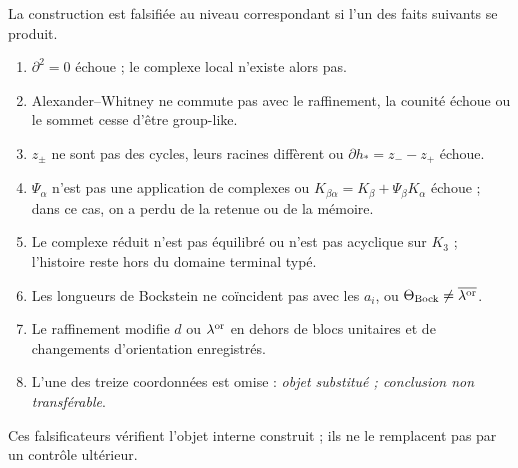 \begin{ablation}
\label{abl:detint-falsadores}
La construction est falsifiée au niveau correspondant si l'un des
faits suivants se produit.
\begin{enumerate}
 \item \(\partial^2=0\) échoue ; le complexe local n'existe alors pas.
 \item Alexander--Whitney ne commute pas avec le raffinement, la counité échoue ou
 le sommet cesse d'être group-like.
 \item \(z_\pm\) ne sont pas des cycles, leurs racines diffèrent ou
 \(\partial h_*=z_--z_+\) échoue.
 \item \(\Psi_\alpha\) n'est pas une application de complexes ou
 \(K_{\beta\alpha}=K_\beta+\Psi_\beta K_\alpha\) échoue ; dans ce cas, on a
 perdu de la retenue ou de la mémoire.
 \item Le complexe réduit n'est pas équilibré ou n'est pas acyclique sur
 \(K_3\) ; l'histoire reste hors du domaine terminal typé.
 \item Les longueurs de Bockstein ne coïncident pas avec les \(a_i\), ou
 \(\Theta_{\rm Bock}\ne\overline{\lambda^{\rm or}}\).
 \item Le raffinement modifie \(d\) ou \(\lambda^{\rm or}\) en dehors de
 blocs unitaires et de changements d'orientation enregistrés.
 \item L'une des treize coordonnées est omise : \emph{objet substitué ;
 conclusion non transférable}.
\end{enumerate}
Ces falsificateurs vérifient l'objet interne construit ; ils ne le remplacent pas
par un contrôle ultérieur.
\end{ablation}
\fi
